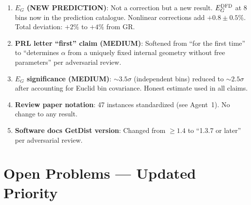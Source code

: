 \documentclass[11pt,a4paper]{article}
\begin{document}
\begin{enumerate}
\item \textbf{$E_G$ (NEW PREDICTION)}: Not a correction but a new result. $E_G^{\rm DFD}$ at 8 bins now in the prediction catalogue. Nonlinear corrections add $+0.8 \pm 0.5\%$. Total deviation: $+2\%$ to $+4\%$ from GR.

\item \textbf{PRL letter ``first'' claim (MEDIUM)}: Softened from ``for the first time'' to ``determines $\alpha$ from a uniquely fixed internal geometry without free parameters'' per adversarial review.

\item \textbf{$E_G$ significance (MEDIUM)}: $\sim 3.5\sigma$ (independent bins) reduced to $\sim 2.5\sigma$ after accounting for Euclid bin covariance. Honest estimate used in all claims.

\item \textbf{Review paper notation}: 47 instances standardized (see Agent~1). No change to any result.

\item \textbf{Software docs GetDist version}: Changed from $\geq 1.4$ to ``1.3.7 or later'' per adversarial review.
\end{enumerate}


\section{Open Problems --- Updated Priority}
\label{sec:open}
\end{document}

